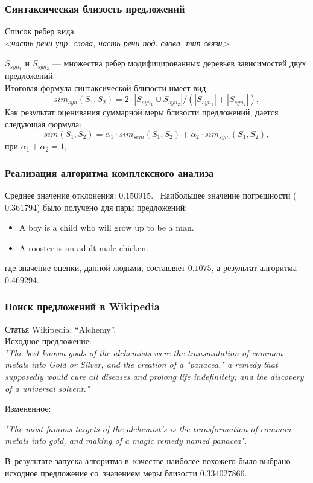 \documentclass{beamer}
\begin{document}
\begin{frame}
\frametitle{Синтаксическая близость предложений}
Список ребер вида:\\

\textit{<часть речи упр. слова, часть речи под. слова, тип связи>}.

$S_{syn_1}$ и $S_{syn_2}$ --- множества ребер 
модифицированных деревьев зависимостей двух предложений.\\
\vspace{0.2cm}
Итоговая формула синтаксической близости имеет вид: 
$$sim_{syn}(S_1, S_2) = 2 \cdot |S_{syn_1} \cup S_{syn_2}| / (|S_{syn_1}| + |S_{syn_2}|),$$ 
\vspace{0.1cm}
Как результат оценивания суммарной меры близости предложений, 
дается следующая формула:
$$sim(S_1, S_2) = \alpha_1 \cdot sim_{sem}(S_1, S_2) + \alpha_2 \cdot sim_{sym}(S_1, S_2),$$
 при $\alpha_1+\alpha_2=1$,

\end{frame}

\begin{frame}
\frametitle{Реализация алгоритма комплексного анализа}

Среднее значение отклонения: $0.150915$.\
\vspace{0.1cm}
Наибольшее значение погрешности ($0.361794$) было получено для пары предложений:
\begin{itemize}
\item {
	A boy is a child who will grow up to be a man.
}
\item {
	A rooster is an adult male chicken.
}
\end{itemize}
где значение оценки, данной людьми, составляет $0.1075$, а результат алгоритма --- $0.469294$.

\end{frame}

\begin{frame}
\frametitle{Поиск предложений в Wikipedia}

\vspace{0.2cm}
Статья Wikipedia: ``Alchemy''.\\
Исходное предложение:\\
\textit{"The best known goals of the alchemists were the transmutation of common metals into Gold or Silver, and the creation of a "panacea," a remedy that supposedly would cure all diseases and prolong life indefinitely; and the discovery of a universal solvent."}

Измененное:

\textit{"The most famous targets of the alchemist's is the transformation of common metals into gold, and making of a magic remedy named panacea".}

В~результате запуска алгоритма в~качестве наиболее похожего 
было выбрано исходное предложение со~значением меры близости $0.334027866$.
\end{frame}
\end{document}
